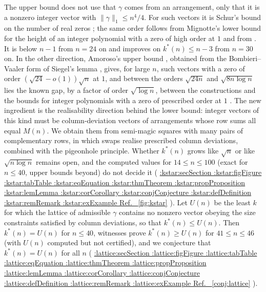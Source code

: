 \documentclass[11pt,a4paper]{article}
\makeatletter
\def\Cref@getprefix#1:#2\relax{#1}
\def\Cref@prefix@sec{sec}
\def\Cref@prefix@fig{fig}
\def\Cref@prefix@tab{tab}
\def\Cref@prefix@eq{eq}
\def\Cref@prefix@thm{thm}
\def\Cref@prefix@prop{prop}
\def\Cref@prefix@lem{lem}
\def\Cref@prefix@cor{cor}
\def\Cref@prefix@conj{conj}
\def\Cref@prefix@def{def}
\def\Cref@prefix@rem{rem}
\def\Cref@prefix@ex{ex}
\def\Cref@type@cap#1{%
  \edef\Cref@tmp{#1}%
  \ifx\Cref@tmp\Cref@prefix@sec Section%
  \else\ifx\Cref@tmp\Cref@prefix@fig Figure%
  \else\ifx\Cref@tmp\Cref@prefix@tab Table%
  \else\ifx\Cref@tmp\Cref@prefix@eq Equation%
  \else\ifx\Cref@tmp\Cref@prefix@thm Theorem%
  \else\ifx\Cref@tmp\Cref@prefix@prop Proposition%
  \else\ifx\Cref@tmp\Cref@prefix@lem Lemma%
  \else\ifx\Cref@tmp\Cref@prefix@cor Corollary%
  \else\ifx\Cref@tmp\Cref@prefix@conj Conjecture%
  \else\ifx\Cref@tmp\Cref@prefix@def Definition%
  \else\ifx\Cref@tmp\Cref@prefix@rem Remark%
  \else\ifx\Cref@tmp\Cref@prefix@ex Example%
  \else Ref.%
  \fi\fi\fi\fi\fi\fi\fi\fi\fi\fi\fi\fi
}
\DeclareRobustCommand{\Cref}[1]{%
  \begingroup
  \edef\Cref@label{#1}%
  \edef\Cref@prefix{\expandafter\Cref@getprefix\Cref@label:\relax}%
  \hyperref[#1]{\Cref@type@cap{\Cref@prefix}~\ref*{#1}}%
  \endgroup
}
\theoremstyle{plain}
\theoremstyle{definition}
\theoremstyle{remark}
\makeatother
\begin{document}
The upper bound does not use that $\gamma$ comes from an arrangement, only that it is a nonzero integer vector with $\|\gamma\|_1\le n^4/4$.
For such vectors it is Schur's bound on the number of real zeros \cite{schur1933,erdosturan1950}; the same order follows from Mignotte's lower bound for the height of an integer polynomial with a zero of high order at $1$ \cite{mignotte1982,amoroso1995} and from \cite[Thm.~2.1]{BEK1999}.
It is below $n-1$ from $n=24$ on and improves on $k^*(n)\le n-3$ from $n=30$ on.
In the other direction, Amoroso's upper bound \cite[Thm.~2]{amoroso1995}, obtained from the Bombieri--Vaaler form of Siegel's lemma \cite{bombieri1987low}, gives, for large $n$, such vectors with a zero of order $(\sqrt{24}-o(1))\sqrt n$ at $1$, and between the orders $\sqrt{24n}$ and $\sqrt{8n\log n}$ lies the known gap, by a factor of order $\sqrt{\log n}$, between the constructions and the bounds for integer polynomials with a zero of prescribed order at $1$ \cite{mignotte1982,bombieri1987low,amoroso1995,BEK1999}.
The new ingredient is the realisability direction behind the lower bound: integer vectors of this kind must be column-deviation vectors of arrangements whose row sums all equal $M(n)$.
We obtain them from semi-magic squares with many pairs of complementary rows, in which swaps realise prescribed column deviations, combined with the pigeonhole principle.
Whether $k^*(n)$ grows like $\sqrt n$ or like $\sqrt{n\log n}$ remains open, and the computed values for $14\le n\le100$ (exact for $n\le40$, upper bounds beyond) do not decide it (\Cref{fig:kstar}).
Let $U(n)$ be the least $k$ for which the lattice of admissible $\gamma$ contains no nonzero vector obeying the size constraints satisfied by column deviations, so that $k^*(n)\le U(n)$.  Then $k^*(n)=U(n)$ for $n\le40$, witnesses prove $k^*(n)\ge U(n)$ for $41\le n\le46$ (with $U(n)$ computed but not certified), and we conjecture that $k^*(n)=U(n)$ for all $n$ (\Cref{conj:lattice}).
\end{document}
